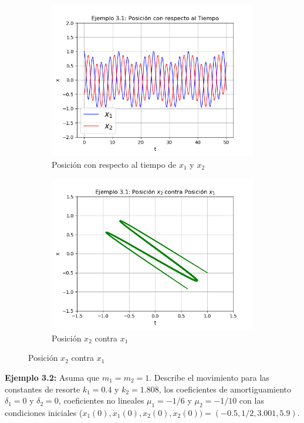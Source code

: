 \documentclass[a4paper]{article}
\begin{document}
\begin{center}
\begin{figure}[ht!]
\begin{subfigure}{0.6\textwidth}
  \includegraphics[width=\linewidth]{ejemplo_3_1_1.png}
  \caption{Posición con respecto al tiempo de $x_1$ y $x_2$}
\end{subfigure}
\begin{subfigure}{0.6\textwidth}
  \centering
  \includegraphics[width=\linewidth]{ejemplo_3_1_4.png}
  \caption{Posición $x_2$ contra $x_1$}
\end{subfigure}
\end{figure}

\pagebreak

\textbf{Ejemplo 3.2:} Asuma que $m_1 = m_2 = 1$. Describe el movimiento para las constantes de resorte $k_1 = 0.4$ y $k_2 = 1.808$, los coeficientes de amortiguamiento $\delta_1 = 0$ y $\delta_2 = 0$, coeficientes no lineales $\mu_1 = -1/6$ y $\mu_2 = -1/10$ con las condiciones iniciales ($x_1(0), \dot x_1(0), x_2(0), \dot x_2(0)) = (-0.5,1/2,3.001,5.9)$.


\end{center}
\end{document}
